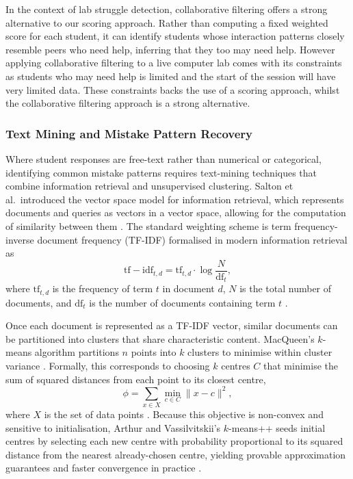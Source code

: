 In the context of lab struggle detection, collaborative filtering offers a strong alternative to our scoring approach. Rather than computing a fixed weighted score for each student, it can identify students whose interaction patterns closely resemble peers who need help, inferring that they too may need help. However applying collaborative filtering to a live computer lab comes with its constraints as students who may need help is limited and the start of the session will have very limited data. These constraints backs the use of a scoring approach, whilst the collaborative filtering approach is a strong alternative.


\subsubsection{Text Mining and Mistake Pattern Recovery} \label{sec: text mining}

Where student responses are free-text rather than numerical or categorical,
 identifying common mistake patterns requires text-mining techniques that combine information retrieval and unsupervised clustering.
Salton et al.\ introduced the vector space model for information retrieval, which represents documents and queries as vectors in a vector space, allowing for the computation of similarity between them \cite{saltonVectorSpaceModel1975}.
The standard weighting scheme is term frequency-inverse document frequency (TF-IDF) formalised in modern information retrieval as
\begin{equation}
    \mathrm{tf-idf}_{t, d} = \mathrm{tf}_{t, d} \cdot \log\frac{N}{\mathrm{df}_t},
    \label{eq:tfidf}
\end{equation}
where $\mathrm{tf}_{t, d}$ is the frequency of term $t$ in document $d$, $N$ is the total number of documents, and $\mathrm{df}_t$ is the number of documents containing term $t$ \cite{manningIntroductionInformationRetrieval2006}.

Once each document is represented as a TF-IDF vector, similar documents can be partitioned into clusters that share characteristic content.
MacQueen's $k$-means algorithm partitions $n$ points into $k$ clusters to minimise within cluster variance
\cite{MacQueen1967SomeMF}. 
Formally, this corresponds to choosing $k$ centres $C$ that minimise the sum of squared distances from each point to its closest centre,
\begin{equation}
    \phi = \sum_{x \in X} \min_{c \in C} \|x - c\|^2,
    \label{eq:kmeans}
\end{equation}
where $X$ is the set of data points \cite{arthurKmeansAdvantagesCareful}.
Because this objective is non-convex and sensitive to initialisation, Arthur and Vassilvitskii's $k$-means++ seeds initial centres by selecting each new centre with probability proportional to its squared distance from the nearest already-chosen centre, yielding provable approximation guarantees and faster convergence in practice \cite{arthurKmeansAdvantagesCareful}.

